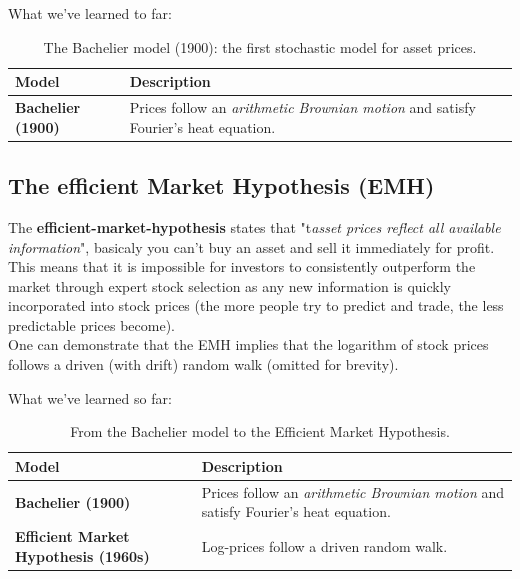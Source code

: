 What we've learned to far:

\begin{table}[H]
\centering
{}
\begin{tabular}{@{}p{4cm}p{8.5cm}@{}}
\toprule
\rowcolor{gray!15}
\textbf{Model} & \textbf{Description} \\ \midrule
\textbf{Bachelier (1900)} &
Prices follow an \emph{arithmetic Brownian motion} and satisfy Fourier's heat equation. \\
\bottomrule
\end{tabular}
\caption{The Bachelier model (1900): the first stochastic model for asset prices.}
\end{table}


\subsection{The efficient Market Hypothesis (EMH)}
The \textbf{efficient-market-hypothesis} states that "t\textit{asset prices reflect all available information}", basicaly you can't buy an asset and sell it immediately for profit.\\
This means that it is impossible for investors to consistently outperform the market through expert stock selection as any new information is quickly incorporated into stock prices (the more people try to predict and trade, the less predictable prices become).\\

 One can demonstrate that the EMH implies that the logarithm of stock prices follows a driven (with drift) random walk (omitted for brevity).

What we've learned so far:

\begin{table}[H]
\centering
{}
\begin{tabular}{@{}p{4cm}p{8.5cm}@{}}
\toprule
\rowcolor{gray!15}
\textbf{Model} & \textbf{Description} \\ \midrule
\textbf{Bachelier (1900)} &
Prices follow an \emph{arithmetic Brownian motion} and satisfy Fourier's heat equation. \\[3pt]
\textbf{Efficient Market Hypothesis (1960s)} &
Log-prices follow a driven random walk. \\ 
\bottomrule
\end{tabular}
\caption{From the Bachelier model to the Efficient Market Hypothesis.}
\end{table}

